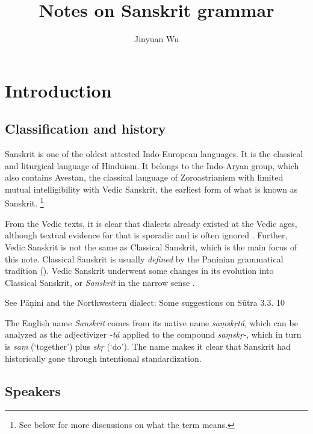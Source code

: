 \documentclass[a4paper, oneside, 12pt]{report}
\title{Notes on Sanskrit grammar}
\author{Jinyuan Wu}
\newcommand{\form}[1]{\emph{#1}}
\newcommand{\translate}[1]{`#1'}
\begin{document}
\maketitle

\chapter{Introduction}

\section{Classification and history}

Sanskrit is one of the oldest attested Indo-European languages.
It is the classical and liturgical language of Hinduism.
It belongs to the Indo-Aryan group,
which also contains Avestan, the classical language of Zoroastrianism
with limited mutual intelligibility with Vedic Sanskrit,
the earliest form of what is known as Sanskrit.%
\footnote{
    See below for more discussions on what the term means.
}

From the Vedic texts, it is clear that dialects already existed at the Vedic ages,
although textual evidence for that is sporadic and is often ignored \citep{witzel1989tracing}.
Further, Vedic Sanskrit is not the same as Classical Sanskrit,
which is the main focus of this note.
Classical Sanskrit is usually \emph{defined} by the Paninian grammatical tradition ().
Vedic Sanskrit underwent some changes in its evolution into Classical Sanskrit,
or \emph{Sanskrit} in the narrow sense \citep{burrow2001sanskrit}.

See Pāṇini and the Northwestern dialect: Some suggestions on Sūtra 3.3. 10

The English name \form{Sanskrit} comes from its native name \form{saṃskṛtá},
which can be analyzed as the adjectivizer \form{-tá} applied to the compound \form{saṃskṛ-},
which in turn is \form{sam} (\translate{together}) 
plus \form{skṛ} (\translate{do}).
The name makes it clear that Sanskrit had historically gone through intentional standardization.

\section{Speakers}
\end{document}
